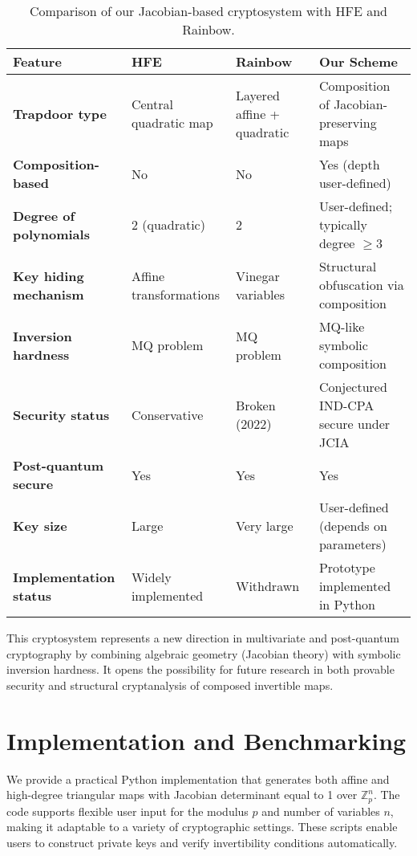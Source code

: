\documentclass[12pt]{article}
\begin{document}
\begin{table}[H]
\centering
\renewcommand{\arraystretch}{1.25}
\begin{tabularx}{\textwidth}{|X|X|X|X|}
\hline
\textbf{Feature} & \textbf{HFE} & \textbf{Rainbow} & \textbf{Our Scheme} \\
\hline
\textbf{Trapdoor type} & Central quadratic map & Layered affine + quadratic & Composition of Jacobian-preserving maps \\
\hline
\textbf{Composition-based} & No & No & Yes (depth user-defined) \\
\hline
\textbf{Degree of polynomials} & 2 (quadratic) & 2 & User-defined; typically degree \(\geq 3\) \\
\hline
\textbf{Key hiding mechanism} & Affine transformations & Vinegar variables & Structural obfuscation via composition \\
\hline
\textbf{Inversion hardness} & MQ problem & MQ problem & MQ-like symbolic composition \\
\hline
\textbf{Security status} & Conservative & Broken (2022) & Conjectured IND-CPA secure under JCIA \\
\hline
\textbf{Post-quantum secure} & Yes & Yes & Yes \\
\hline
\textbf{Key size} & Large & Very large & User-defined (depends on parameters) \\
\hline
\textbf{Implementation status} & Widely implemented & Withdrawn & Prototype implemented in Python \\
\hline
\end{tabularx}
\caption{Comparison of our Jacobian-based cryptosystem with HFE and Rainbow.}
\end{table}


This cryptosystem represents a new direction in multivariate and post-quantum cryptography by combining algebraic geometry (Jacobian theory) with symbolic inversion hardness. It opens the possibility for future research in both provable security and structural cryptanalysis of composed invertible maps.



\section{Implementation and Benchmarking}

We provide a practical Python implementation that generates both affine and high-degree triangular maps with Jacobian determinant equal to 1 over \( \mathbb{Z}_p^n \). The code supports flexible user input for the modulus \( p \) and number of variables \( n \), making it adaptable to a variety of cryptographic settings. These scripts enable users to construct private keys and verify invertibility conditions automatically.
\end{document}
